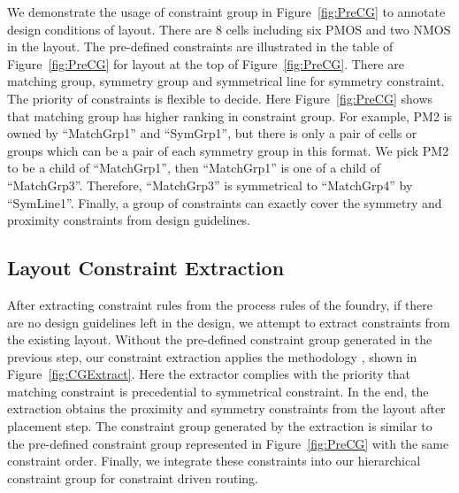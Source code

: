     
      We demonstrate the usage of constraint group in Figure~\ref{fig:PreCG} to annotate design conditions of layout. There are 8 cells including six PMOS and two NMOS in the layout. The pre-defined constraints are illustrated in the table of Figure~\ref{fig:PreCG} for layout at the top of Figure~\ref{fig:PreCG}. There are matching group, symmetry group and symmetrical line for symmetry constraint. The priority of constraints is flexible to decide. Here Figure~\ref{fig:PreCG} shows that matching group has higher ranking in constraint group. For example, PM2 is owned by ``MatchGrp1'' and ``SymGrp1'', but there is only a pair of cells or groups which can be a pair of each symmetry group in this format. We pick PM2 to be a child of  ``MatchGrp1'', then ``MatchGrp1'' is one of a child of ``MatchGrp3''. Therefore, ``MatchGrp3'' is symmetrical to ``MatchGrp4'' by ``SymLine1''. Finally, a group of constraints can exactly cover the symmetry and proximity constraints from design guidelines.


    \subsection{Layout Constraint Extraction}\label{sec:LayoutConExt}
      After extracting constraint rules from the process rules of the foundry, if there are no design guidelines left in the design, we attempt to extract constraints from the existing layout. Without the pre-defined constraint group generated in the previous step, our constraint extraction applies the methodology \cite{srm-massier-tcad08,ALP_YPWeng_iccad2011}, shown in Figure~\ref{fig:CGExtract}. Here the extractor complies with the priority that matching constraint is precedential to symmetrical constraint. In the end, the extraction obtains the proximity and symmetry constraints from the layout after placement step. The constraint group generated by the extraction is similar to the pre-defined constraint group represented in Figure~\ref{fig:PreCG} with the same constraint order. Finally, we integrate these constraints into our hierarchical constraint group for constraint driven routing.
    
